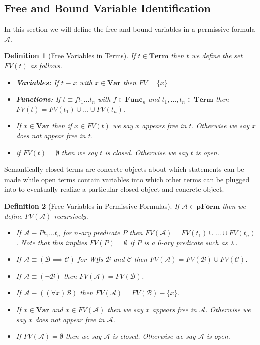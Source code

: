 \documentclass[12pt]{article}
\theoremstyle{break}
\newtheorem{definition}{Definition}[section]
\theoremstyle{break}
\theoremstyle{break}
\theoremstyle{break}
\theoremstyle{break}
\newtheorem{informal definition}[definition]{Informal Definition}
\newcommand{\mc}[1]{\mathcal{#1}}
\begin{document}
\subsection{Free and Bound Variable Identification}

In this section we will define the free and bound variables in a permissive formula $\mc{A}$.


\begin{definition}[Free Variables in Terms]
If $t\in \textbf{Term}$ then $t$ we define the set $FV(t)$ as follows.
\begin{itemize}
\item{\textbf{Variables:} If $t\equiv x$ with $x\in\textbf{Var}$ then $FV = \{x\}$}
\item{\textbf{Functions:} If $t\equiv ft_1\ldots t_n$ with $f\in\textbf{Func}_n$ and $t_1,\ldots,t_n \in \textbf{Term}$ then $FV(t) = FV(t_1)\cup\ldots \cup FV(t_n)$.}
\item{If $x\in \textbf{Var}$ then if $x\in FV(t)$ we say $x$ appears free in $t$. Otherwise we say $x$ does not appear free in $t$.}
\item{if $FV(t)=\emptyset$ then we say $t$ is closed. Otherwise we say $t$ is open.}
\end{itemize}
\end{definition}

Semantically closed terms are concrete objects about which statements can be made while open terms contain variables into which other terms can be plugged into to eventually realize a particular closed object and concrete object.

\begin{definition}[Free Variables in Permissive Formulas]
If $\mc{A}\in\textbf{pForm}$ then we define $FV(\mc{A})$ recursively.
\begin{itemize}
\item{If $\mc{A} \equiv Pt_1\ldots t_n$ for $n$-ary predicate $P$ then $FV(\mc{A}) = FV(t_1)\cup\ldots\cup FV(t_n)$. Note that this implies $FV(P)=\emptyset$ if $P$ is a 0-ary predicate such as $\curlywedge$.}
\item{If $\mc{A} \equiv (\mc{B}\implies \mc{C})$ for Wffs $\mc{B}$ and $\mc{C}$ then $FV(\mc{A}) = FV(\mc{B})\cup FV(\mc{C})$.}
\item{If $\mc{A} \equiv (\lnot\mc{B})$ then $FV(\mc{A}) = FV(\mc{B})$.}
\item{If $\mc{A} \equiv ((\forall x)\mc{B})$ then $FV(\mc{A}) = FV(\mc{B}) - \{x\}$.}
\item{If $x \in \textbf{Var}$ and $x\in FV(\mc{A})$ then we say $x$ appears free in $\mc{A}$. Otherwise we say $x$ does not appear free in $\mc{A}$.}
\item{If $FV(\mc{A}) = \emptyset$ then we say $\mc{A}$ is closed. Otherwise we say $\mc{A}$ is open.}
\end{itemize}
\end{definition}
\end{document}
